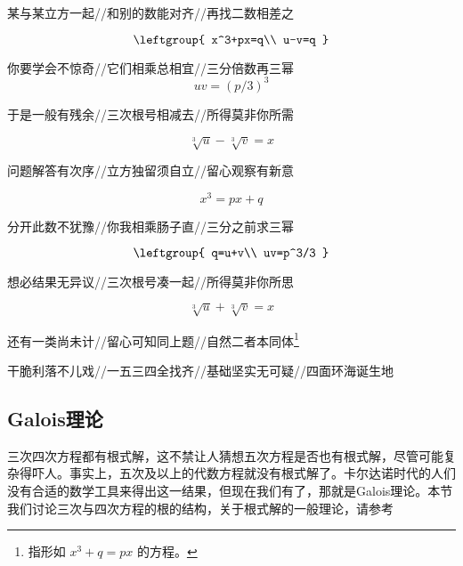 某与某立方一起//和别的数能对齐//再找二数相差之

\begin{equation}
\leftgroup{
    x^3+px=q\\
    u-v=q
}
\end{equation}

你要学会不惊奇//它们相乘总相宜//三分倍数再三幂
\begin{equation}
uv=(p/3)^3
\end{equation}

于是一般有残余//三次根号相减去//所得莫非你所需

\begin{equation}
\sqrt[3]{u}-\sqrt[3]{v}=x
\end{equation}


问题解答有次序//立方独留须自立//留心观察有新意

\begin{equation}
x^3=px+q
\end{equation}

分开此数不犹豫//你我相乘肠子直//三分之前求三幂

\begin{equation}
\leftgroup{
    q=u+v\\
    uv=p^3/3
}
\end{equation}

想必结果无异议//三次根号凑一起//所得莫非你所思

\begin{equation}
\sqrt[3]{u}+\sqrt[3]{v}=x
\end{equation}


还有一类尚未计//留心可知同上题//自然二者本同体\footnote{指形如
$
x^3+q=px
$
的方程。}


干脆利落不儿戏//一五三四全找齐//基础坚实无可疑//四面环海诞生地






\subsection{Galois理论}\label{sub_PlyRtS_1}

三次四次方程都有根式解，这不禁让人猜想五次方程是否也有根式解，尽管可能复杂得吓人。事实上，五次及以上的代数方程就没有根式解了。卡尔达诺时代的人们没有合适的数学工具来得出这一结果，但现在我们有了，那就是Galois理论。本节我们讨论三次与四次方程的根的结构，关于根式解的一般理论，请参考








